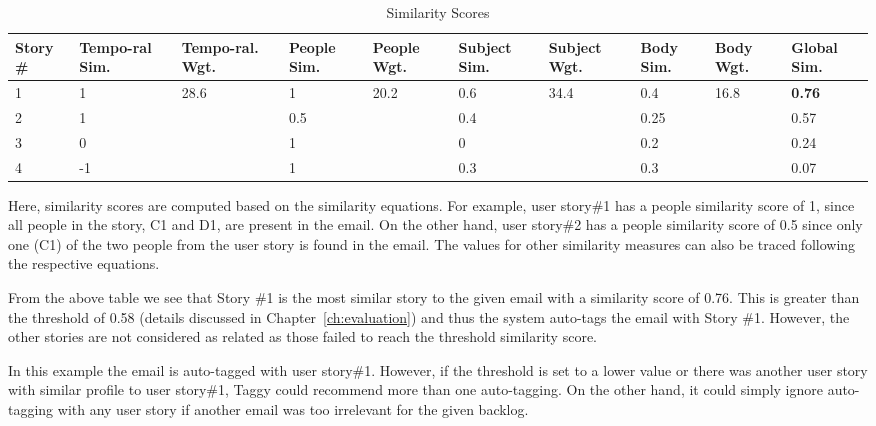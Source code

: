 \begin{table}[h!]
  \centering
  \caption{Similarity Scores}
    \begin{tabular}{|p{1.2cm}|p{1.5cm}|p{1.2cm}|p{1.2cm}|p{1.2cm}|p{1.4cm}|p{1.4cm}|p{1.1cm}|p{1.1cm}|p{1.2cm}|}
      	\hline
		\textbf{Story \#} & \textbf{Tempo-ral Sim.} & \textbf{Tempo-ral. Wgt.} & \textbf{People Sim.} & \textbf{People Wgt.} & \textbf{Subject Sim.} &\textbf{Subject Wgt.} & \textbf{Body Sim.} &\textbf{Body Wgt.} &\textbf{Global Sim.}\\
		\hline
		1 & 1 	& \multirow{4}{*}{28.6} & 1 	& \multirow{4}{*}{20.2}	& 0.6 & \multirow{4}{*}{34.4}	& 0.4 & \multirow{4}{*}{16.8}	& \textbf{0.76}\\
		2 & 1 	&  & 0.5 	&  	& 0.4 	&	& 0.25	&	& 0.57\\
		3 & 0 	&  & 1 		& 	& 0 		& & 0.2	&	& 0.24\\
		4 & -1 	&  & 1 		& 	& 0.3 	& & 0.3	&	& 0.07\\
		\hline
	\end{tabular}
	\label{tab:similarity}
\end{table}  

Here, similarity scores are computed based on the similarity equations. For example, user story\#1 has a people similarity score of 1, since all people in the story, C1 and D1, are present in the email. On the other hand, user story\#2 has a people similarity score of 0.5 since only one (C1) of the two people from the user story is found in the email. The values for other similarity measures can also be traced following the respective equations.

From the above table we see that Story \#1 is the most similar story to the given email with a similarity score of 0.76. This is greater than the threshold of 0.58 (details discussed in Chapter~\ref{ch:evaluation}) and thus the system auto-tags the email with Story \#1. However, the other stories are not considered as related as those failed to reach the threshold similarity score.

In this example the email is auto-tagged with user story\#1. However, if the threshold is set to a lower value or there was another user story with similar profile to user story\#1, Taggy could recommend more than one auto-tagging. On the other hand, it could simply ignore auto-tagging with any user story if another email was too irrelevant for the given backlog.
